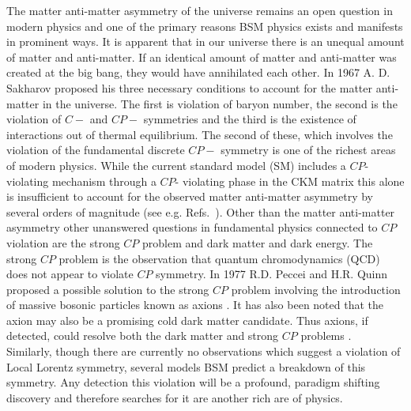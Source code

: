 \documentclass[10pt,a4paper, twoside, openright]{report}
\begin{document}
The matter anti-matter asymmetry of the universe remains an open question in modern physics and one of the primary reasons BSM physics exists and manifests in prominent ways.  It is apparent that in our universe there is an unequal amount of matter and anti-matter. If an identical amount of matter and anti-matter was created at the big bang, they would have annihilated each other. In 1967 A. D. Sakharov proposed his three necessary conditions to account for the matter anti-matter in the universe. The first is violation of baryon number, the second is the violation of $C-$ and $CP-$ symmetries and the third is the existence of interactions out of thermal equilibrium. The second of these, which involves the violation of the fundamental discrete $CP-$ symmetry is one of the richest areas of modern physics. While the current standard model (SM)  includes a $CP$- violating mechanism through a $CP$- violating phase in the CKM matrix \cite{KM1973} this alone is insufficient to account for the observed matter anti-matter asymmetry by several orders of magnitude (see e.g. Refs.~\cite{Sakharov1967,Farrar1993, Huet1994, Pospelov2005, Canetti2012, FS2010}). Other than the matter anti-matter asymmetry other unanswered questions in fundamental physics connected to $CP$ violation are the strong $CP$ problem and dark matter and dark energy. The strong $CP$ problem is the observation that quantum chromodynamics (QCD) does not appear to violate $CP$ symmetry\cite{Peccei1977,Peccei1977D,Weinberg1976,Weinberg1978,Wilczek1978,Moody1984}. In 1977 R.D. Peccei and H.R. Quinn proposed a possible solution to the strong $CP$ problem involving the introduction of  massive bosonic particles known as axions \cite{Peccei1977,Peccei1977D}.  It has also been noted that the axion may also be a promising cold dark matter candidate. Thus axions, if detected, could resolve both the dark matter and strong $CP$ problems \cite{Kim2010,Baer2014,Kawasaki2013}. \\
\linebreak
Similarly, though there are currently no observations which suggest a violation of Local Lorentz symmetry, several models BSM predict a breakdown of this symmetry. Any detection this violation will be a profound, paradigm shifting discovery and therefore searches for it are another rich are of physics.\\ 
\linebreak
\end{document}
